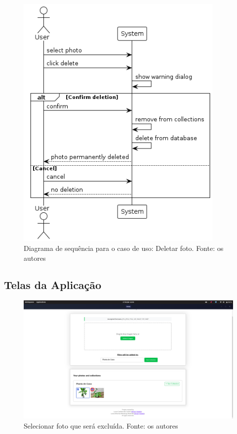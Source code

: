 \begin{figure}[H]
    \centering
    \includegraphics[width=0.9\textwidth]{../figures/dss/UC005.png}
    \caption{Diagrama de sequência para o caso de uso: Deletar foto. Fonte: os autores}
    \label{fig:dss-uc005}
\end{figure}

\subsection{Telas da Aplicação}

\begin{figure}[H]
    \centering
    \includegraphics[width=1\textwidth]{../figures/screens/uc005/Screenshot from 2025-06-27 22-06-27.png}
    \caption{Selecionar foto que será excluída. Fonte: os autores}
    \label{fig:uc005-screen1}
\end{figure}

